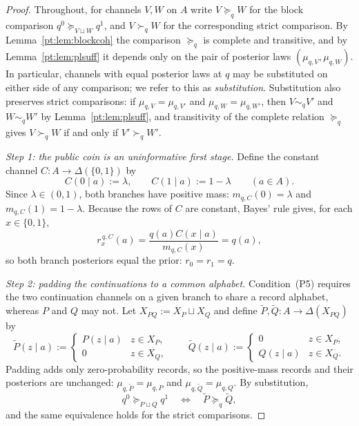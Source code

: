 \documentclass[11pt,a4paper]{article}
\theoremstyle{definition}
\newcommand{\1}{\mathbf 1}
\begin{document}
\begin{proof}
Throughout, for channels $V,W$ on $A$ write $V\succeq_q W$ for the block comparison $q^0\succeq_{V\sqcup W}q^1$, and
$V\succ_q W$ for the corresponding strict comparison.  By Lemma~\ref{pt:lem:blockcoh} the comparison $\succeq_q$ is
complete and transitive, and by Lemma~\ref{pt:lem:plsuff} it depends only on the pair of posterior laws
$(\mu_{q,V},\mu_{q,W})$.  In particular, channels with equal posterior laws at $q$ may be substituted on either side of
any comparison; we refer to this as \emph{substitution}.  Substitution also preserves strict comparisons: if
$\mu_{q,V}=\mu_{q,V'}$ and $\mu_{q,W}=\mu_{q,W'}$, then $V\sim_q V'$ and $W\sim_q W'$ by Lemma~\ref{pt:lem:plsuff}, and
transitivity of the complete relation $\succeq_q$ gives $V\succ_q W$ if and only if $V'\succ_q W'$.

\emph{Step 1: the public coin is an uninformative first stage.}
Define the constant channel $C:A\to\Delta(\{0,1\})$ by
\[
C(0\mid a):=\lambda,
\qquad
C(1\mid a):=1-\lambda
\qquad(a\in A).
\]
Since $\lambda\in(0,1)$, both branches have positive mass: $m_{q,C}(0)=\lambda$ and $m_{q,C}(1)=1-\lambda$.  Because
the rows of $C$ are constant, Bayes' rule gives, for each $x\in\{0,1\}$,
\[
r_x^{\,q,C}(a)=\frac{q(a)C(x\mid a)}{m_{q,C}(x)}=q(a),
\]
so both branch posteriors equal the prior: $r_0=r_1=q$.

\emph{Step 2: padding the continuations to a common alphabet.}
Condition~\textup{(P5)} requires the two continuation channels on a given branch to share a record alphabet, whereas $P$
and $Q$ may not.  Let $X_{PQ}:=X_P\sqcup X_Q$ and define $\widetilde P,\widetilde Q:A\to\Delta(X_{PQ})$ by
\[
\widetilde P(z\mid a):=
\begin{cases}
P(z\mid a)&z\in X_P,\\
0&z\in X_Q,
\end{cases}
\qquad
\widetilde Q(z\mid a):=
\begin{cases}
0&z\in X_P,\\
Q(z\mid a)&z\in X_Q.
\end{cases}
\]
Padding adds only zero-probability records, so the positive-mass records and their posteriors are unchanged:
$\mu_{q,\widetilde P}=\mu_{q,P}$ and $\mu_{q,\widetilde Q}=\mu_{q,Q}$.  By substitution,
\[
q^0\succeq_{P\sqcup Q}q^1
\quad\Longleftrightarrow\quad
\widetilde P\succeq_q\widetilde Q,
\]
and the same equivalence holds for the strict comparisons.


\end{proof}
\end{document}
